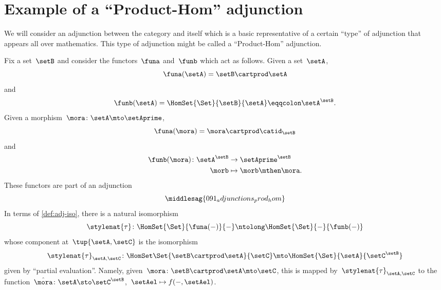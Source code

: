 
\section[Product-Hom adjunction]{Example of a ``Product-Hom'' adjunction}
We will consider an adjunction between the category \Set and itself which is a basic representative of a certain ``type'' of adjunction that appears all over mathematics.
This type of adjunction might be called a ``Product-Hom'' adjunction.

Fix a set~$\setB$ and consider the functors~$\funa$ and~$\funb$ which act as follows.
Given a set~$\setA$,
\begin{equation}
    \funa(\setA) = \setB \cartprod \setA
\end{equation}
and
\begin{equation}
    \funb(\setA) = \HomSet{\Set}{\setB}{\setA} \eqqcolon \setA^\setB.
\end{equation}
Given a morphism~$\mora\colon \setA \mto \setAprime$,
\begin{equation}
    \funa(\mora) = \mora \cartprod \catid_\setB
\end{equation}
and
\begin{equation}
    \begin{aligned}
        \funb(\mora)\colon \setA^\setB & \to \setAprime^\setB \\
        \morb                          & \mapsto \morb \mthen \mora.
    \end{aligned}
\end{equation}
%
These functors are part of an adjunction
%
\begin{equation}
    \middlesag{091_adjunctions_prod_hom}
\end{equation}
In terms of \cref{def:adj-iso}, there is a natural isomorphism
\begin{equation}
    \stylenat{\tau}\colon \HomSet{\Set}{\funa(- )}{-}  \ntolong   \HomSet{\Set}{-}{\funb( - )}
\end{equation}
whose component at~$\tup{\setA,\setC}$ is the isomorphism
\begin{equation}
    \stylenat{\tau}_{\setA,\setC} \colon \HomSet\Set{\setB\cartprod \setA}{\setC} \mto \HomSet{\Set}{\setA}{\setC^\setB}
\end{equation}
given by ``partial evaluation''.
Namely, given~$\mora \colon \setB \cartprod \setA \mto \setC$, this is mapped by~$\stylenat{\tau}_{\setA,\setC}$ to the function~$\hat \mora \colon \setA \sto \setC^\setB$,~$\setAel \mapsto f( -, \setAel)$.

